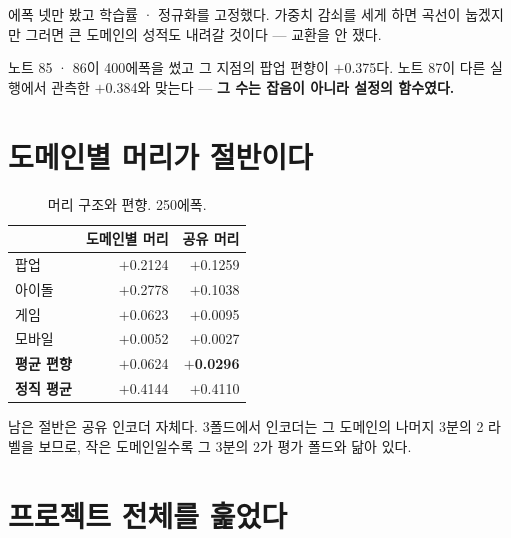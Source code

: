 \documentclass[10pt]{article}
\begin{document}
{에폭 넷만 봤고 학습률 · 정규화를 고정했다. 가중치 감쇠를 세게 하면 곡선이
눕겠지만 그러면 큰 도메인의 성적도 내려갈 것이다 --- 교환을 안 쟀다.}

노트 85 · 86이 400에폭을 썼고 그 지점의 팝업 편향이 $+$0.375다. 노트 87이
다른 실행에서 관측한 $+$0.384와 맞는다 --- \textbf{그 수는 잡음이 아니라
설정의 함수였다.}

\section{도메인별 머리가 절반이다}

\begin{table}[t]
\centering\tsize
\caption{머리 구조와 편향. 250에폭.}
\begin{tabular}{lrr}
\toprule
& 도메인별 머리 & 공유 머리 \\
\midrule
팝업 & $+$0.2124 & $+$0.1259 \\
아이돌 & $+$0.2778 & $+$0.1038 \\
게임 & $+$0.0623 & $+$0.0095 \\
모바일 & $+$0.0052 & $+$0.0027 \\
\midrule
\textbf{평균 편향} & $+$0.0624 & \textbf{$+$0.0296} \\
\textbf{정직 평균} & $+$0.4144 & $+$0.4110 \\
\bottomrule
\end{tabular}
\end{table}


남은 절반은 공유 인코더 자체다. 3폴드에서 인코더는 그 도메인의 나머지 3분의 2
라벨을 보므로, 작은 도메인일수록 그 3분의 2가 평가 폴드와 닮아 있다.

\section{프로젝트 전체를 훑었다}
\end{document}
